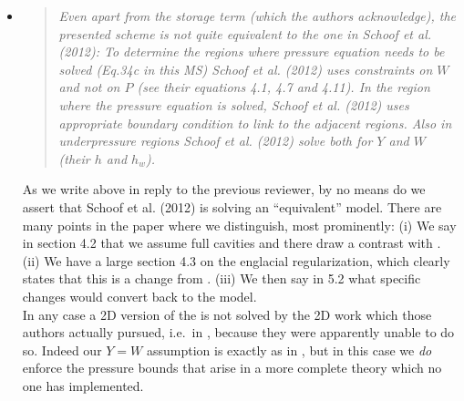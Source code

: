 \documentclass[11pt,reqno]{amsart}
\newcommand{\reply}[2]{
\medskip\medskip
\item  \begin{quote}
\emph{#1}
\end{quote}

\medskip
\noindent #2}
\begin{document}
\begin{itemize}
\reply{Even apart from the storage term (which the authors acknowledge), the presented
scheme is not quite equivalent to the one in Schoof et al. (2012): To determine the
regions where pressure equation needs to be solved (Eq.34c in this MS) Schoof et al.
(2012) uses constraints on $W$ and not on $P$ (see their equations 4.1, 4.7 and 4.11). In
the region where the pressure equation is solved, Schoof et al. (2012) uses appropriate boundary condition to link to the adjacent regions.  Also in underpressure regions
Schoof et al. (2012) solve both for $Y$ and $W$ (their $h$ and $h_w$).}
{As we write above in reply to the previous reviewer, by no means do we assert that Schoof et al. (2012) \cite{Schoofetal2012} is solving an ``equivalent'' model.  There are many points in the paper where we distinguish, most prominently: (i) We say in section 4.2 that we assume full cavities and there draw a contrast with \cite{Schoofetal2012}. (ii) We have a large section 4.3 on the englacial regularization, which clearly states that this is a change from \cite{Schoofetal2012}. (iii) We then say in 5.2 what specific changes would convert back to the \cite{Schoofetal2012} model. \\
\indent In any case a 2D version of the \cite{Schoofetal2012} is not solved by the 2D work which those authors actually pursued, i.e.~in \cite{Werderetal2013}, because they were apparently unable to do so.  Indeed our $Y=W$ assumption is exactly as in \cite{Werderetal2013}, but in this case we \emph{do} enforce the pressure bounds that arise in a more complete theory which no one has implemented.}


\end{itemize}
\end{document}
